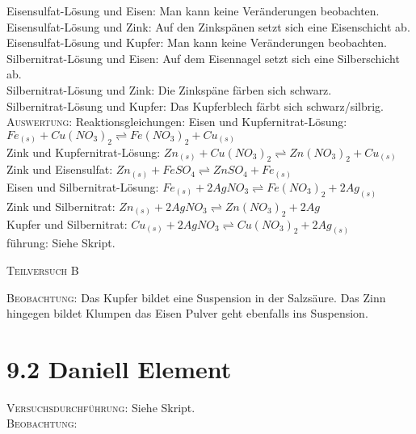 \documentclass[11pt, a4paper]{article}
\begin{document}
Eisensulfat-Lösung und Eisen: Man kann keine Veränderungen beobachten.\\
Eisensulfat-Lösung und Zink: Auf den Zinkspänen setzt sich eine Eisenschicht ab. \\
Eisensulfat-Lösung und Kupfer: Man kann keine Veränderungen beobachten.\\

Silbernitrat-Lösung und Eisen: Auf dem Eisennagel setzt sich eine Silberschicht ab. \\
Silbernitrat-Lösung und Zink: Die Zinkspäne färben sich schwarz. \\
Silbernitrat-Lösung und Kupfer: Das Kupferblech färbt sich schwarz/silbrig. \\

\textsc{Auswertung:}\hspace{8mm} Reaktionsgleichungen:
Eisen und Kupfernitrat-Lösung: $Fe_{(s)} + Cu(NO_3)_2 \rightleftharpoons Fe(NO_3)_2 + Cu_{(s)}$\\
Zink und Kupfernitrat-Lösung: $Zn_{(s)} + Cu(NO_3)_2 \rightleftharpoons Zn(NO_3)_2 + Cu_{(s)}$\\
Zink und Eisensulfat: $Zn_{(s)} + FeSO_4 \rightleftharpoons ZnSO_4 + Fe_{(s)}$\\
Eisen und Silbernitrat-Lösung: $Fe_{(s)} + 2AgNO_3 \rightleftharpoons Fe(NO_3)_2 + 2Ag_{(s)}$\\
Zink und Silbernitrat: $Zn_{(s)} + 2AgNO_3 \rightleftharpoons Zn(NO_3)_2 + 2Ag$\\
Kupfer und Silbernitrat: $Cu_{(s)} + 2AgNO_3 \rightleftharpoons Cu(NO_3)_2 + 2Ag_{(s)}$\\führung: Siehe Skript.\\

\begin{center}
\textsc{Teilversuch B}
\end{center}

\textsc{Beobachtung:}\hspace{5mm} Das Kupfer bildet eine Suspension in der Salzsäure. Das Zinn hingegen bildet Klumpen das Eisen Pulver geht ebenfalls ins Suspension.
\newpage
\section{9.2 Daniell Element}

\textsc{Versuchsdurchführung:} Siehe Skript.\\

\textsc{Beobachtung:}\hspace{5mm} 
\end{document}
